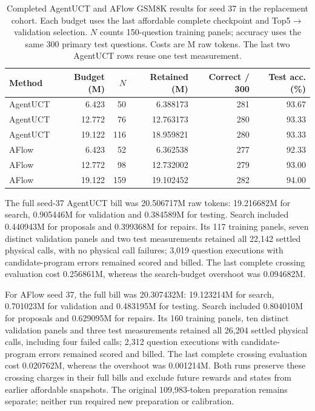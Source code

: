 \begin{table}[t]
\centering\small
\caption{Completed AgentUCT and AFlow GSM8K results for seed 37 in the
replacement cohort. Each budget uses the last affordable complete checkpoint
and Top5$\to$validation selection. $N$ counts 150-question training panels;
accuracy uses the same 300 primary test questions. Costs are M raw tokens.
The last two AgentUCT rows reuse one test measurement.}
\label{tab:gsm-counted-seed37}
\setlength{\tabcolsep}{4pt}
\begin{tabular}{@{}lrrrrr@{}}
\toprule
Method & Budget (M) & $N$ & Retained (M) & Correct / 300 & Test acc. (\%)\\
\midrule
AgentUCT & 6.423 & 50 & 6.388173 & 281 & 93.67\\
AgentUCT & 12.772 & 76 & 12.763173 & 280 & 93.33\\
AgentUCT & 19.122 & 116 & 18.959821 & 280 & 93.33\\
AFlow & 6.423 & 52 & 6.362538 & 277 & 92.33\\
AFlow & 12.772 & 98 & 12.732002 & 279 & 93.00\\
AFlow & 19.122 & 159 & 19.102452 & 282 & 94.00\\
\bottomrule
\end{tabular}
\end{table}

The full seed-37 AgentUCT bill was 20.506717M raw tokens: 19.216682M
for search, 0.905446M for validation and 0.384589M for testing. Search
included 0.440943M for proposals and 0.399368M for repairs. Its 117
training panels, seven distinct validation panels and two test measurements
retained all 22,142 settled physical calls, with no physical call failures;
3,019 question executions with candidate-program errors remained scored
and billed. The last complete crossing evaluation cost 0.256861M,
whereas the search-budget overshoot was 0.094682M.

For AFlow seed 37, the full bill was 20.307432M: 19.123214M for search,
0.701023M for validation and 0.483195M for testing. Search included
0.804010M for proposals and 0.629095M for repairs. Its 160 training panels,
ten distinct validation panels and three test measurements retained all
26,204 settled physical calls, including four failed calls; 2,312 question
executions with candidate-program errors remained scored and billed.
The last complete crossing evaluation cost 0.020762M, whereas the
overshoot was 0.001214M. Both runs preserve these crossing charges in
their full bills and exclude future rewards and states from earlier
affordable snapshots. The original 109,983-token preparation remains
separate; neither run required new preparation or calibration.


